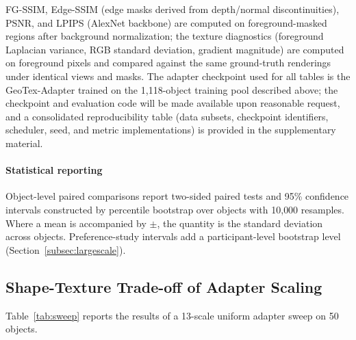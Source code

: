\documentclass[times,twocolumn,final]{elsarticle}
\begin{document}
FG-SSIM, Edge-SSIM (edge masks derived from depth/normal discontinuities), PSNR, and LPIPS (AlexNet backbone) are computed on foreground-masked regions after background normalization; the texture diagnostics (foreground Laplacian variance, RGB standard deviation, gradient magnitude) are computed on foreground pixels and compared against the same ground-truth renderings under identical views and masks. The adapter checkpoint used for all tables is the GeoTex-Adapter trained on the 1,118-object training pool described above; the checkpoint and evaluation code will be made available upon reasonable request, and a consolidated reproducibility table (data subsets, checkpoint identifiers, scheduler, seed, and metric implementations) is provided in the supplementary material.

\paragraph{Statistical reporting}
Object-level paired comparisons report two-sided paired tests and 95\% confidence intervals constructed by percentile bootstrap over objects with 10{,}000 resamples. Where a mean is accompanied by $\pm$, the quantity is the standard deviation across objects. Preference-study intervals add a participant-level bootstrap level (Section~\ref{subsec:largescale}).

\subsection{Shape-Texture Trade-off of Adapter Scaling}
\label{subsec:tradeoff}

Table~\ref{tab:sweep} reports the results of a 13-scale uniform adapter sweep on 50 objects.
\end{document}
